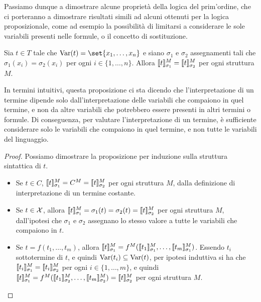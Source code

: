 Passiamo dunque a dimostrare alcune proprietà della logica del prim'ordine, che ci porteranno a dimostrare risultati simili ad alcuni ottenuti per la logica proposizionale, come ad esempio la possibilità di limitarsi a considerare le sole variabili presenti nelle formule, o il concetto di sostituzione.


\begin{proposition}[label=prop:term_interpretation_independence]{}
  Sia \(t \in T\) tale che \(\Var(t) = \set{x_1, \ldots, x_n}\) e siano \(\sigma_1\) e \(\sigma_2\) assegnamenti tali che \(\sigma_1(x_i) = \sigma_2(x_i)\) per ogni \(i\in\{1,\ldots,n\}\). Allora \(\den{t}[M][\sigma_1] = \den{t}[M][\sigma_2]\) per ogni struttura \(M\).
\end{proposition}

In termini intuitivi, questa proposizione ci sta dicendo che l'interpretazione di un termine dipende solo dall'interpretazione delle variabili che compaiono in quel termine, e non da altre variabili che potrebbero essere presenti in altri termini o formule. Di conseguenza, per valutare l'interpretazione di un termine, è sufficiente considerare solo le variabili che compaiono in quel termine, e non tutte le variabili del linguaggio.

\begin{proof}
  Possiamo dimostrare la proposizione per induzione sulla struttura sintattica di \(t\).
  \begin{itemize}
    \item Se \(t\in C\), \(\den{t}[M][\sigma_1] = C^M = \den{t}[M][\sigma_2]\) per ogni struttura \(M\), dalla definizione di interpretazione di un termine costante.
    \item Se \(t\in\mathcal{X}\), allora \(\den{t}[M][\sigma_1] = \sigma_1(t)= \sigma_2(t) = \den{t}[M][\sigma_2]\) per ogni struttura \(M\), dall'ipotesi che \(\sigma_1\) e \(\sigma_2\) assegnano lo stesso valore a tutte le variabili che compaiono in \(t\).
    \item Se \(t = f(t_1,\ldots,t_m)\), allora \(\den{t}[M][\sigma_1] = f^M(\den{t_1}[M][\sigma_1], \ldots, \den{t_m}[M][\sigma_1])\). Essendo \(t_i\) sottotermine di \(t\), e quindi \(\operatorname{Var}(t_i)\subseteq \operatorname{Var}(t)\), per ipotesi induttiva si ha che \(\den{t_i}[M][\sigma_1] = \den{t_i}[M][\sigma_2]\) per ogni \(i\in\{1,\ldots,m\}\), e quindi \(\den{t}[M][\sigma_1] = f^M(\den{t_1}[M][\sigma_2], \ldots, \den{t_m}[M][\sigma_2]) = \den{t}[M][\sigma_2]\) per ogni struttura \(M\).
  \end{itemize}
\end{proof}


